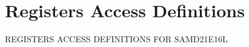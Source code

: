 \hypertarget{group___s_a_m_d21_e16_l__reg}{}\section{Registers Access Definitions}
\label{group___s_a_m_d21_e16_l__reg}
R\+E\+G\+I\+S\+T\+E\+RS A\+C\+C\+E\+SS D\+E\+F\+I\+N\+I\+T\+I\+O\+NS F\+OR S\+A\+M\+D21\+E16L 